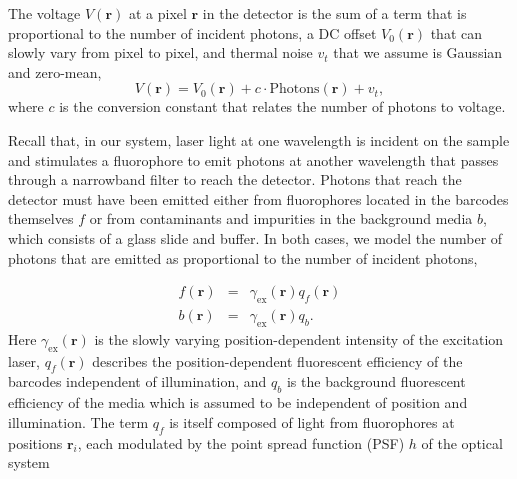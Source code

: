 
The voltage $V(\mathbf{r})$ at a pixel $\mathbf{r}$ in the detector is the sum of a term that is proportional to the number of incident photons, a DC offset $V_0(\mathbf{r})$ that can slowly vary from pixel to pixel, and thermal noise $v_t$ that we assume is Gaussian and zero-mean,
\begin{equation}\label{eq:V_of_r}
V(\mathbf{r})=V_0(\mathbf{r})+c \cdot \text{Photons}(\mathbf{r}) +v_t,
\end{equation}
where $c$ is the conversion constant that relates the number of photons to voltage. 


Recall that, in our system, laser light at one wavelength is incident on the sample and stimulates a fluorophore to emit photons at another wavelength that passes through a narrowband filter to reach the detector. Photons that reach the detector must have been emitted either from fluorophores located  in the barcodes themselves $f$ or from contaminants and impurities in the background media $b$, which consists of a glass slide and buffer.  In both cases, we model the number of photons that are emitted as proportional to the number of incident photons, 

\begin{eqnarray}\label{eq:f_and_b}
f(\mathbf{r})&=&\gamma_{\text{ex}}(\mathbf{r}) q_f(\mathbf{r})\\
b(\mathbf{r})&=&\gamma_{\text{ex}}(\mathbf{r}) q_b.
\end{eqnarray}
Here $\gamma_{\text{ex}}(\mathbf{r})$ is the slowly varying position-dependent intensity of the excitation laser,  $q_f(\mathbf{r})$ describes the position-dependent fluorescent efficiency of the barcodes independent of illumination, and $q_b$ is the background fluorescent efficiency of the media which is assumed to be independent of position and illumination. The term $q_f$ is itself composed of light from fluorophores at positions $\mathbf{r}_i$, each modulated by the point spread function (PSF) $h$ of the optical system

